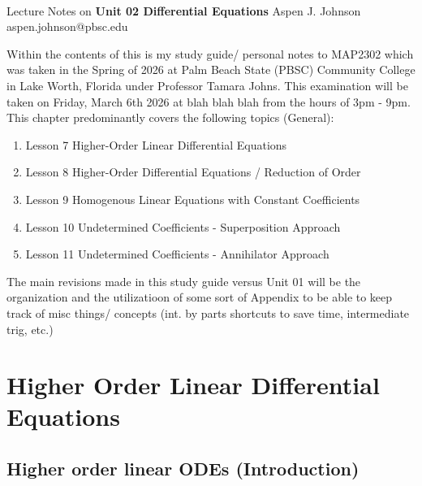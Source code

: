 \documentclass[10pt]{article}
\begin{document}
\thispagestyle{empty}
\bigskip \
\vspace{0.1cm}

\begin{center}
{\fontsize{22}{22} \selectfont Lecture Notes on}
\vskip 16pt
{\fontsize{25}{25} \selectfont \bf \sffamily Unit 02 Differential Equations}
\vskip 24pt
{\fontsize{18}{18} \selectfont \rmfamily Aspen J. Johnson} 
\vskip 6pt
{\fontsize{14}{14} \selectfont \ttfamily aspen.johnson@pbsc.edu} 
\vskip 24pt
\end{center}

{\parindent0pt \baselineskip=15.5pt }

Within the contents of this is my study guide/ personal notes to MAP2302 which was taken in the Spring of 2026 at 
Palm Beach State (PBSC) Community College in Lake Worth, Florida under Professor Tamara Johns. This examination will be 
taken on Friday, March 6th 2026 at blah blah blah from the hours of 3pm - 9pm. \\

This chapter predominantly covers the following topics (General):

\begin{enumerate}
    \item Lesson 7 Higher-Order Linear Differential Equations
    \item Lesson 8 Higher-Order Differential Equations / Reduction of Order
    \item Lesson 9 Homogenous Linear Equations with Constant Coefficients
    \item  Lesson 10 Undetermined Coefficients - Superposition Approach
    \item Lesson 11 Undetermined Coefficients - Annihilator Approach
\end{enumerate} 

The main revisions made in this study guide versus Unit 01 will be the organization and the utilizatioon of some sort of Appendix to be able to 
keep track of misc things/ concepts (int. by parts shortcuts to save time, intermediate trig, etc.)

\newpage
\microtoc
\newpage

\section{Higher Order Linear Differential Equations}
\subsection{Higher order linear ODEs (Introduction)}
\end{document}
